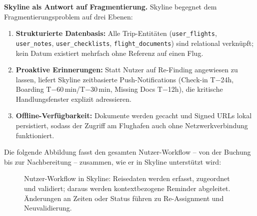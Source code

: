 \medskip\noindent\textbf{Skyline als Antwort auf Fragmentierung.}
Skyline begegnet dem Fragmentierungsproblem auf drei Ebenen:
\begin{enumerate}
  \item \textbf{Strukturierte Datenbasis:} Alle Trip-Entitäten
  (\texttt{user\_flights}, \texttt{user\_notes}, \texttt{user\_checklists},
  \texttt{flight\_documents}) sind relational verknüpft; kein Datum existiert
  mehrfach ohne Referenz auf einen Flug.
  \item \textbf{Proaktive Erinnerungen:} Statt Nutzer auf Re-Finding
  angewiesen zu lassen, liefert Skyline zeitbasierte Push-Notifications
  (Check-in T$-$24h, Boarding T$-$60\,min/T$-$30\,min, Missing Docs T$-$12h),
  die kritische Handlungsfenster explizit adressieren.
  \item \textbf{Offline-Verfügbarkeit:} Dokumente werden gecacht und
  Signed URLs lokal persistiert, sodass der Zugriff am Flughafen auch ohne
  Netzwerkverbindung funktioniert.
\end{enumerate}

Die folgende Abbildung fasst den gesamten Nutzer-Workflow -- von der Buchung
bis zur Nachbereitung -- zusammen, wie er in Skyline unterstützt wird:

\begin{figure}[H]
  \centering
  \caption{Nutzer-Workflow in Skyline: Reisedaten werden erfasst, zugeordnet und
    validiert; daraus werden kontextbezogene Reminder abgeleitet. Änderungen
    an Zeiten oder Status führen zu Re-Assignment und Neuvalidierung.}
  \label{fig:user_workflow_upload_remind}
\end{figure}

